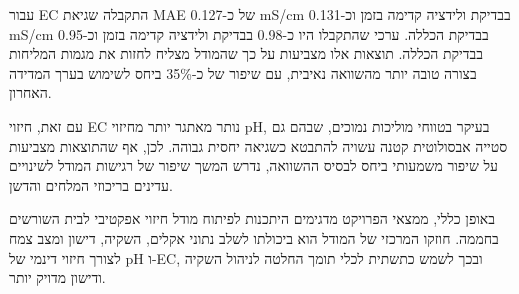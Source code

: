 עבור EC התקבלה שגיאת MAE של כ-0.127 mS/cm בבדיקת ולידציה קדימה בזמן וכ-0.131 mS/cm בבדיקת הכללה. ערכי \Rtwo{} שהתקבלו היו כ-0.98 בבדיקת ולידציה קדימה בזמן וכ-0.95 בבדיקת הכללה. תוצאות אלו מצביעות על כך שהמודל מצליח לחזות את מגמות המליחות בצורה טובה יותר מהשוואה נאיבית, עם שיפור של כ-35\% ביחס לשימוש בערך המדידה האחרון.

עם זאת, חיזוי EC נותר מאתגר יותר מחיזוי pH, בעיקר בטווחי מוליכות נמוכים, שבהם גם סטייה אבסולוטית קטנה עשויה להתבטא כשגיאה יחסית גבוהה. לכן, אף שהתוצאות מצביעות על שיפור משמעותי ביחס לבסיס ההשוואה, נדרש המשך שיפור של רגישות המודל לשינויים עדינים בריכוזי המלחים והדשן.

באופן כללי, ממצאי הפרויקט מדגימים היתכנות לפיתוח מודל חיזוי אפקטיבי לבית השורשים בחממה. חוזקו המרכזי של המודל הוא ביכולתו לשלב נתוני אקלים, השקיה, דישון ומצב צמח לצורך חיזוי דינמי של pH ו-EC, ובכך לשמש כתשתית לכלי תומך החלטה לניהול השקיה ודישון מדויק יותר.

\newpage

